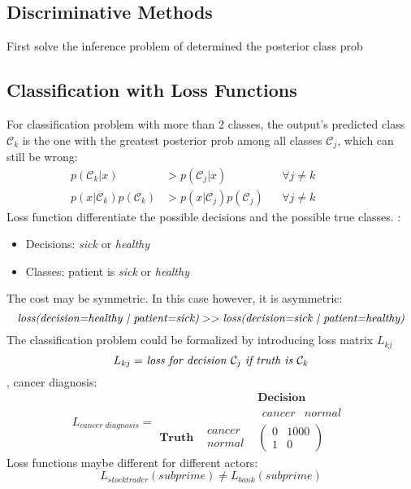 \subsection{Discriminative Methods}
First solve the inference problem of determined the posterior class \ac{prob}

\subsection{Classification with Loss Functions}
For classification problem with more than 2 classes, the output's predicted class $\mathcal{C}_k$ is the one with the greatest posterior \ac{prob} among all classes $\mathcal{C}_j$, which can still be wrong:
\begin{align*}
	p(\mathcal{C}_k|x) &> p(\mathcal{C}_j|x) && \forall j \neq k && && \\
	p(x|\mathcal{C}_k)p(\mathcal{C}_k) &> p(x|\mathcal{C}_j)p(\mathcal{C}_j) && \forall j \neq k && &&
\end{align*}
Loss function differentiate the possible decisions and the possible true classes. \Eg:
\begin{itemize}
	\item Decisions: \textit{sick} or \textit{healthy}
	\item Classes: patient is \textit{sick} or \textit{healthy}
\end{itemize}
The cost may be symmetric. In this case however, it is asymmetric:
\[\text{\textit{loss(decision=healthy | patient=sick)}} >> \text{\textit{loss(decision=sick | patient=healthy)}} \]
The classification problem could be formalized by introducing loss matrix $L_{kj}$
\[ L_{kj} =$ \textit{loss for decision} $\mathcal{C}_j$ \textit{if truth is} $\mathcal{C}_k \]
\Eg, cancer diagnosis:
\[L_{cancer\;diagnosis} = \begin{matrix}
	  & & \textbf{Decision}\\
	  & & \begin{matrix}
	  		cancer & normal
	  \end{matrix}\\
  	\textbf{Truth} & \begin{matrix}
  		cancer \\ normal
  	\end{matrix} & \begin{pmatrix}
		0 & 1000\\
		1 & 0
	\end{pmatrix}
\end{matrix}\]
Loss functions maybe different for different actors:
\[ L_{stocktrader}(subprime) \neq L_{bank}(subprime)\]

